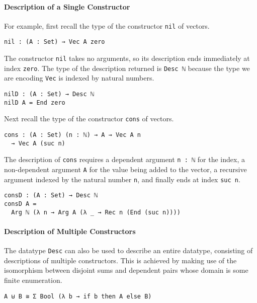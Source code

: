 \documentclass[preprint,nonatbib]{sigplanconf}
\begin{document}
\paragraph{Description of a Single Constructor}

For example, first recall the type of the
constructor {\tt nil} of vectors.

\begin{verbatim}
nil : (A : Set) → Vec A zero
\end{verbatim}

The constructor {\tt nil} takes no arguments, so its description
ends immediately at index {\tt zero}. The type of the description
returned is {\tt Desc ℕ} because the type we are encoding {\tt Vec}
is indexed by natural numbers.

\begin{verbatim}
nilD : (A : Set) → Desc ℕ
nilD A = End zero
\end{verbatim}

Next recall the type of the
constructor {\tt cons} of vectors.

\begin{verbatim}
cons : (A : Set) (n : ℕ) → A → Vec A n
  → Vec A (suc n)
\end{verbatim}

The description of {\tt cons} requires a dependent argument
{\tt n : ℕ} for the index, a non-dependent argument {\tt A} for the value
being added to the vector, a recursive argument indexed by the
natural number {\tt n}, and finally ends at index {\tt suc n}.

\begin{verbatim}
consD : (A : Set) → Desc ℕ
consD A =
  Arg ℕ (λ n → Arg A (λ _ → Rec n (End (suc n))))
\end{verbatim}

\paragraph{Description of Multiple Constructors}
\label{sec:background:multiple}

The datatype {\tt Desc} can also be used to describe an entire
datatype, consisting of descriptions of multiple constructors.
This is achieved by making use of the isomorphism between disjoint
sums and dependent pairs whose domain is some finite enumeration.

\begin{verbatim}
A ⊎ B ≅ Σ Bool (λ b → if b then A else B)
\end{verbatim}
\end{document}
